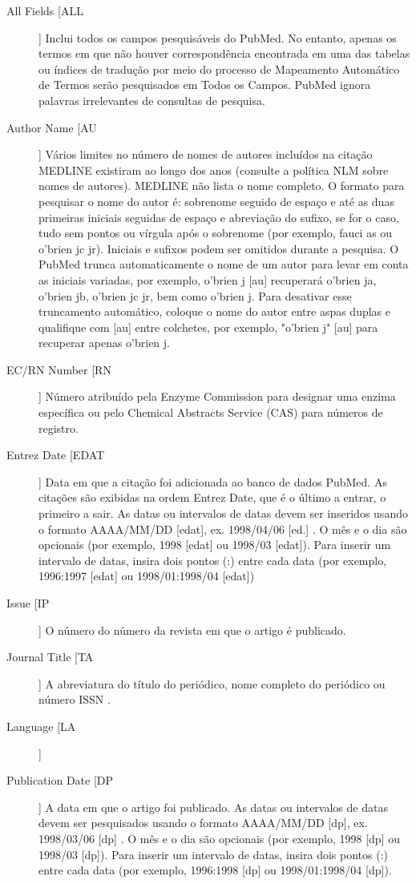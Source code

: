 \documentclass[letter,11pt]{book}
\begin{document}
\begin{description}
\item[All Fields [ALL]]  Inclui todos os campos pesquisáveis do PubMed. No entanto, apenas os termos em que não houver correspondência encontrada em uma das tabelas ou índices de tradução por meio do processo de Mapeamento Automático de Termos serão pesquisados em Todos os Campos. PubMed ignora palavras irrelevantes de consultas de pesquisa.  
\item[Author Name [AU]] Vários limites no número de nomes de autores incluídos na citação MEDLINE existiram ao longo dos anos (consulte a política NLM sobre nomes de autores). MEDLINE não lista o nome completo. O formato para pesquisar o nome do autor é: sobrenome seguido de espaço e até as duas primeiras iniciais seguidas de espaço e abreviação do sufixo, se for o caso, tudo sem pontos ou vírgula após o sobrenome (por exemplo, fauci as ou o'brien jc jr). Iniciais e sufixos podem ser omitidos durante a pesquisa. O PubMed trunca automaticamente o nome de um autor para levar em conta as iniciais variadas, por exemplo, o'brien j [au] recuperará o'brien ja, o'brien jb, o'brien jc jr, bem como o'brien j. Para desativar esse truncamento automático, coloque o nome do autor entre aspas duplas e qualifique com [au] entre colchetes, por exemplo, "o'brien j" [au] para recuperar apenas o'brien j. 
\item[EC/RN Number [RN]] Número atribuído pela Enzyme Commission para designar uma enzima específica ou pelo Chemical Abstracts Service (CAS) para números de registro.  
\item[Entrez Date [EDAT]] Data em que a citação foi adicionada ao banco de dados PubMed. As citações são exibidas na ordem Entrez Date, que é o último a entrar, o primeiro a sair. As datas ou intervalos de datas devem ser inseridos usando o formato AAAA/MM/DD [edat], ex. 1998/04/06 [ed.] . O mês e o dia são opcionais (por exemplo, 1998 [edat] ou 1998/03 [edat]). Para inserir um intervalo de datas, insira dois pontos (:) entre cada data (por exemplo, 1996:1997 [edat] ou 1998/01:1998/04 [edat])
\item[Issue [IP]] O número do número da revista em que o artigo é publicado.  
\item[Journal Title [TA]] A abreviatura do título do periódico, nome completo do periódico ou número ISSN .
\item[Language [LA]] 
\item[Publication Date [DP]] A data em que o artigo foi publicado. As datas ou intervalos de datas devem ser pesquisados usando o formato AAAA/MM/DD [dp], ex. 1998/03/06 [dp] . O mês e o dia são opcionais (por exemplo, 1998 [dp] ou 1998/03 [dp]). Para inserir um intervalo de datas, insira dois pontos (:) entre cada data (por exemplo, 1996:1998 [dp] ou 1998/01:1998/04 [dp]). 

\end{description}
\end{document}
